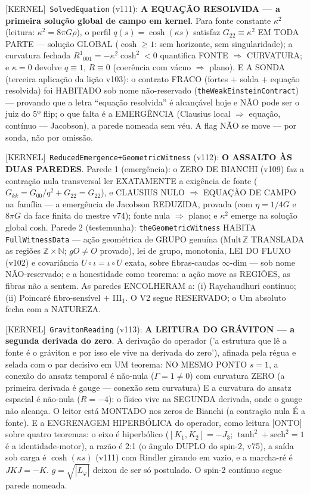 \documentclass[11pt]{article}
\providecommand{\kernelmk}[1]{\textsf{[KERNEL]}~\texttt{#1}}\providecommand{\knownmk}[1]{\textsf{[KNOWN]}~{#1}}\providecommand{\statusmk}[1]{\textsf{[#1]}}
\theoremstyle{definition}\newtheorem{deriv}{Derivação}
\begin{document}
\kernelmk{SolvedEquation} (v111): \textbf{A EQUAÇÃO RESOLVIDA --- a primeira solução global de campo em kernel}. Para fonte constante $\kappa^2$ (leitura: $\kappa^2=8\pi G\rho$), o perfil $q(s)=\cosh(\kappa s)$ satisfaz $G_{22}\equiv\kappa^2$ EM TODA PARTE --- solução GLOBAL ($\cosh\ge 1$: sem horizonte, sem singularidade); a curvatura fechada $R^1{}_{001}=-\kappa^2\cosh^2<0$ quantifica FONTE $\Rightarrow$ CURVATURA; e $\kappa=0$ devolve $q\equiv 1$, $R\equiv 0$ (coerência com vácuo $\Rightarrow$ plano). E A SONDA (terceira aplicação da lição v103): o contrato FRACO (fortes $+$ solda $+$ equação resolvida) foi HABITADO sob nome não-reservado (\texttt{theWeakEinsteinContract}) --- provando que a letra ``equação resolvida'' é alcançável hoje e NÃO pode ser o juiz do 5º flip; o que falta é a EMERGÊNCIA (Clausius local $\Rightarrow$ equação, contínuo --- Jacobson), a parede nomeada sem véu. A flag NÃO se move --- por sonda, não por omissão.

\kernelmk{ReducedEmergence+\allowbreak GeometricWitness} (v112): \textbf{O ASSALTO ÀS DUAS PAREDES}. Parede 1 (emergência): o ZERO DE BIANCHI (v109) faz a contração nula transversal ler EXATAMENTE a exigência de fonte ($G_{kk}=G_{00}/q^2+G_{22}=G_{22}$), e CLAUSIUS NULO $\Rightarrow$ EQUAÇÃO DE CAMPO na família --- a emergência de Jacobson REDUZIDA, provada (com $\eta=1/4G$ e $8\pi G$ da face finita do mestre v74); fonte nula $\Rightarrow$ plano; e $\kappa^2$ emerge na solução global cosh. Parede 2 (testemunha): \texttt{theGeometricWitness} HABITA \texttt{FullWitnessData} --- ação geométrica de GRUPO genuína ($\mathrm{Mult}\,\mathbb{Z}$ TRANSLADA as regiões $\mathbb{Z}\times\mathbb{N}$; $gO\neq O$ provado), lei de grupo, monotonia, LEI DO FLUXO (v102) e covariância $U\circ\iota=\iota\circ U$ exata, sobre fibras-caudas $\infty$-dim --- sob nome NÃO-reservado; e a honestidade como teorema: a ação move as REGIÕES, as fibras não a sentem. As paredes ENCOLHERAM a: (i) Raychaudhuri contínuo; (ii) Poincaré fibro-sensível $+$ III$_1$. O V2 segue RESERVADO; o Um absoluto fecha com a NATUREZA.

\kernelmk{GravitonReading} (v113): \textbf{A LEITURA DO GRÁVITON --- a segunda derivada do zero}. A derivação do operador ('a estrutura que lê a fonte é o gráviton e por isso ele vive na derivada do zero'), afinada pela régua e selada com o par decisivo em UM teorema: NO MESMO PONTO $s=1$, a conexão do ansatz temporal é não-nula ($\Gamma=1\neq 0$) com curvatura ZERO (a primeira derivada é gauge --- conexão sem curvatura) E a curvatura do ansatz espacial é não-nula ($R=-4$): o físico vive na SEGUNDA derivada, onde o gauge não alcança. O leitor está MONTADO nos zeros de Bianchi (a contração nula É a fonte). E a ENGRENAGEM HIPERBÓLICA do operador, como leitura [ONTO] sobre quatro teoremas: o eixo é hiperbólico ($[K_1,K_2]=-J_3$; $\tanh^2+\mathrm{sech}^2=1$ é a identidade-motor), a razão é 2:1 (o ângulo DUPLO do spin-2, v75), a saída sob carga é $\cosh(\kappa s)$ (v111) com Rindler girando em vazio, e a marcha-ré é $JKJ=-K$. $g=\sqrt{|L_\varphi|}$ deixou de ser só postulado. O spin-2 contínuo segue parede nomeada.
\end{document}
